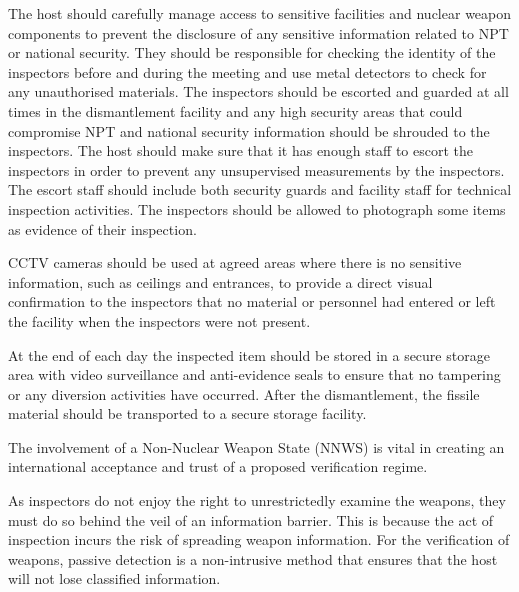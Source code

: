 \documentclass[twoside,titlepage,11pt,twocolumn,a4paper]{article}
\begin{document}
The host should carefully manage access to sensitive facilities and
nuclear weapon components to prevent the disclosure of any sensitive
information related to NPT or national security. They should be
responsible for checking the identity of the inspectors before and
during the meeting and use metal detectors to check for any
unauthorised materials. The inspectors should be escorted and guarded
at all times in the dismantlement facility and any high security areas
that could compromise NPT and national security information should be
shrouded to the inspectors. The host should make sure that it has
enough staff to escort the inspectors in order to prevent any
unsupervised measurements by the inspectors. The escort staff should
include both security guards and facility staff for technical
inspection activities. The inspectors should be allowed to photograph
some items as evidence of their inspection.

CCTV cameras should be used at agreed areas where there is no
sensitive information, such as ceilings and entrances, to provide a
direct visual confirmation to the inspectors that no material or
personnel had entered or left the facility when the inspectors were
not present.

At the end of each day the inspected item should be stored in a secure
storage area with video surveillance and anti-evidence seals to ensure
that no tampering or any diversion activities have occurred. After the
dismantlement, the fissile material should be transported to a secure
storage facility.

The involvement of a Non-Nuclear Weapon State (NNWS) is vital in creating an international acceptance and trust of a proposed verification regime.

As inspectors do not enjoy the right to unrestrictedly examine the
weapons, they must do so behind the veil of an information
barrier. This is because the act of inspection incurs the risk of
spreading weapon information. For the verification of weapons, passive
detection is a non-intrusive method that ensures that the host will
not lose classified information.
\end{document}
